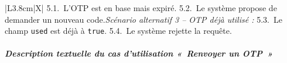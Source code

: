 \begin{table}[H]
\begin{tabularx}{\textwidth}{|L{3.8cm}|X|}
    \hspace*{6pt}5.1.~L'OTP est en base mais expiré.\newline
    \hspace*{6pt}5.2.~Le système propose de demander un nouveau code.\newline[2pt]
    \textit{Scénario alternatif 3 -- OTP déjà utilisé :}\newline
    \hspace*{6pt}5.3.~Le champ \texttt{used} est déjà à \texttt{true}.\newline
    \hspace*{6pt}5.4.~Le système rejette la requête.\\
    \hline
  \end{tabularx}
\end{table}

\subparagraph{Description textuelle du cas d'utilisation «~Renvoyer un OTP~»}

